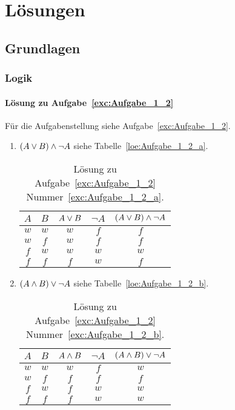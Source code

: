 \part{Lösungen}
\chapter{Grundlagen}
\section{Logik}
\subsection{Lösung zu Aufgabe~\ref{exc:Aufgabe_1_2}}
Für die Aufgabenstellung siehe Aufgabe~\vref{exc:Aufgabe_1_2}.
\label{loe:Aufgabe_1_2}
\begin{enumerate}
\item $\left(A \vee B\right) \wedge \neg A$ siehe Tabelle~\vref{loe:Aufgabe_1_2_a}.
	\begin{table}[htb]
	\center
	\begin{tabular}{c|c||c|c|c}
	$A$ & $B$ & $A \vee B$ & $\neg A$ & $\left(A \vee B\right) \wedge \neg A$\\\hline
	$w$ & $w$ & $w$ & $f$ & $f$\\
	$w$ & $f$ & $w$ & $f$ & $f$\\
	$f$ & $w$ & $w$ & $w$ & $w$\\
	$f$ & $f$ & $f$ & $w$ & $f$\\
	\end{tabular}
	\caption{Lösung zu Aufgabe~\ref{exc:Aufgabe_1_2} Nummer~\ref{exc:Aufgabe_1_2_a}.}
	\label{loe:Aufgabe_1_2_a}
	\end{table}
\item $\left(A \wedge B\right) \vee \neg A$ siehe Tabelle~\vref{loe:Aufgabe_1_2_b}.
	\begin{table}[htb]
	\center
	\begin{tabular}{c|c||c|c|c}
	$A$ & $B$ & $A \wedge B$ & $\neg A$ & $\left(A \wedge B\right) \vee \neg A$\\\hline
	$w$ & $w$ & $w$ & $f$ & $w$\\
	$w$ & $f$ & $f$ & $f$ & $f$\\
	$f$ & $w$ & $f$ & $w$ & $w$\\
	$f$ & $f$ & $f$ & $w$ & $w$\\
	\end{tabular}
	\caption{Lösung zu Aufgabe~\ref{exc:Aufgabe_1_2} Nummer~\ref{exc:Aufgabe_1_2_b}.}
	\label{loe:Aufgabe_1_2_b}
	\end{table}

\end{enumerate}
